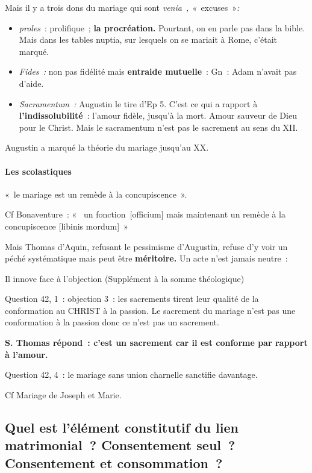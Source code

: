 Mais il y a trois dons du mariage qui sont \emph{venia~,
«~}excuses~»\emph{:}

\begin{itemize}
\item
  \emph{proles}~: prolifique~; \textbf{la procréation.} Pourtant, on en
  parle pas dans la bible. Mais dans les tables nuptia, sur lesquels on
  se mariait à Rome, c'était marqué.
\item
  \emph{Fides~:} non pas fidélité mais \textbf{entraide mutuelle}~: Gn~:
  Adam n'avait pas d'aide.
\item
  \emph{Sacramentum~:} Augustin le tire d'Ep 5. C'est ce qui a rapport à
  \textbf{l'indissolubilité}~: l'amour fidèle, jusqu'à la mort. Amour
  sauveur de Dieu pour le Christ. Mais le sacramentum n'est pas le
  sacrement au sens du XII.
\end{itemize}

Augustin a marqué la théorie du mariage jusqu'au XX.

\hypertarget{les-scolastiques}{%
\paragraph{Les scolastiques}\label{les-scolastiques}}

«~le mariage est un remède à la concupiscence~».

Cf Bonaventure~: «~ un fonction~{[}officium{]} mais maintenant un remède
à la concupiscence {[}libinis mordum{]}~»

Mais Thomas d'Aquin, refusant le pessimisme d'Augustin, refuse d'y voir
un péché systématique mais peut être \textbf{méritoire.} Un acte n'est
jamais neutre~:

Il innove face à l'objection (Supplément à la somme théologique)

Question 42, 1~: objection 3~: les sacrements tirent leur qualité de la
conformation au CHRIST à la passion. Le sacrement du mariage n'est pas
une conformation à la passion donc ce n'est pas un sacrement.

\textbf{S. Thomas répond~: c'est un sacrement car il est conforme par
rapport à l'amour.}

Question 42, 4~: le mariage sans union charnelle sanctifie davantage.

Cf Mariage de Joseph et Marie.

\hypertarget{quel-est-luxe9luxe9ment-constitutif-du-lien-matrimonial-consentement-seul-consentement-et-consommation}{%
\subsection{Quel est l'élément constitutif du lien matrimonial~?
Consentement seul~? Consentement et
consommation~?}\label{quel-est-luxe9luxe9ment-constitutif-du-lien-matrimonial-consentement-seul-consentement-et-consommation}}

